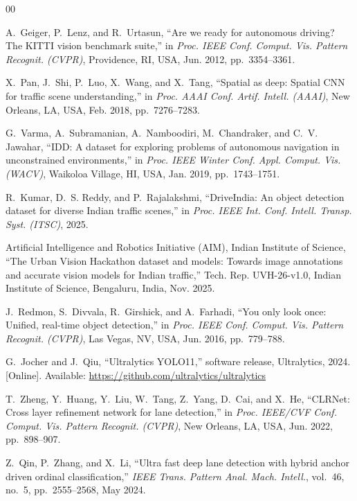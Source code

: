 \documentclass[conference]{IEEEtran}
\begin{document}
\begin{thebibliography}{00}

A.~Geiger, P.~Lenz, and R.~Urtasun, ``Are we ready for autonomous driving? The
KITTI vision benchmark suite,'' in \textit{Proc. IEEE Conf. Comput. Vis. Pattern
Recognit. (CVPR)}, Providence, RI, USA, Jun. 2012, pp.~3354--3361.

X.~Pan, J.~Shi, P.~Luo, X.~Wang, and X.~Tang, ``Spatial as deep: Spatial CNN for
traffic scene understanding,'' in \textit{Proc. AAAI Conf. Artif. Intell.
(AAAI)}, New Orleans, LA, USA, Feb. 2018, pp.~7276--7283.

G.~Varma, A.~Subramanian, A.~Namboodiri, M.~Chandraker, and C.~V. Jawahar,
``IDD: A dataset for exploring problems of autonomous navigation in
unconstrained environments,'' in \textit{Proc. IEEE Winter Conf. Appl. Comput.
Vis. (WACV)}, Waikoloa Village, HI, USA, Jan. 2019, pp.~1743--1751.

R.~Kumar, D.~S. Reddy, and P.~Rajalakshmi, ``DriveIndia: An object detection
dataset for diverse Indian traffic scenes,'' in \textit{Proc. IEEE Int. Conf.
Intell. Transp. Syst. (ITSC)}, 2025.

Artificial Intelligence and Robotics Initiative (AIM), Indian Institute of
Science, ``The Urban Vision Hackathon dataset and models: Towards image
annotations and accurate vision models for Indian traffic,'' Tech. Rep.
UVH-26-v1.0, Indian Institute of Science, Bengaluru, India, Nov. 2025.

J.~Redmon, S.~Divvala, R.~Girshick, and A.~Farhadi, ``You only look once:
Unified, real-time object detection,'' in \textit{Proc. IEEE Conf. Comput. Vis.
Pattern Recognit. (CVPR)}, Las Vegas, NV, USA, Jun. 2016, pp.~779--788.

G.~Jocher and J.~Qiu, ``Ultralytics YOLO11,'' software release, Ultralytics,
2024. [Online]. Available: \url{https://github.com/ultralytics/ultralytics}

T.~Zheng, Y.~Huang, Y.~Liu, W.~Tang, Z.~Yang, D.~Cai, and X.~He, ``CLRNet: Cross
layer refinement network for lane detection,'' in \textit{Proc. IEEE/CVF Conf.
Comput. Vis. Pattern Recognit. (CVPR)}, New Orleans, LA, USA, Jun. 2022,
pp.~898--907.

Z.~Qin, P.~Zhang, and X.~Li, ``Ultra fast deep lane detection with hybrid
anchor driven ordinal classification,'' \textit{IEEE Trans. Pattern Anal. Mach.
Intell.}, vol.~46, no.~5, pp.~2555--2568, May 2024.


\end{thebibliography}
\end{document}
